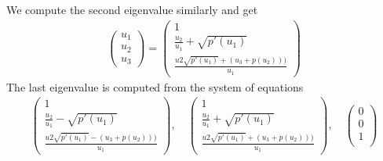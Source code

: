 We compute the second eigenvalue similarly and get 
\begin{align*}
\begin{pmatrix}
u_1 \\ u_2 \\u_3
\end{pmatrix} = \begin{pmatrix}
1 \\
 \frac{u_2}{u_1} + \sqrt{p'(u_1 )} \\
 \frac{u2 \sqrt{p'(u_1)}+(u_3+p(u_2)))}{u_1} 
\end{pmatrix}
\end{align*}
The last eigenvalue is computed from the system of equations
\begin{align*}
\begin{pmatrix}
1 \\
 \frac{u_2}{u_1} - \sqrt{p'(u_1 )} \\
 \frac{u2 \sqrt{p'(u_1)}-(u_3+p(u_2)))}{u_1} 
\end{pmatrix}, \quad \begin{pmatrix}
1 \\
 \frac{u_2}{u_1} + \sqrt{p'(u_1 )} \\
 \frac{u2 \sqrt{p'(u_1)}+(u_3+p(u_2)))}{u_1} 
\end{pmatrix}, \quad \begin{pmatrix}
 0 \\
 0  \\
 1 \\
\end{pmatrix}
\end{align*}
